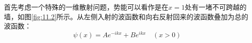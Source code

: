 \documentclass[a4paper,zihao=-4,linespread=1]{ctexrep}
\begin{document}
	首先考虑一个特殊的一维散射问题，势能可以看作是在$x=1$处有一堵不可跨越的墙，如图\ref{fig:11.2}所示。从左侧入射的波函数和向右反射回来的波函数叠加为总的波函数：
	\[\psi(x)=Ae^{-ikx}+Be^{ikx}\quad (x>0)\]
	\begin{figure}[h]
		\centering
		\subfigure[$V\neq 0$] %
		{
			\begin{minipage}{6cm}
				\centering      %

\end{minipage}}
\end{figure}
\end{document}
